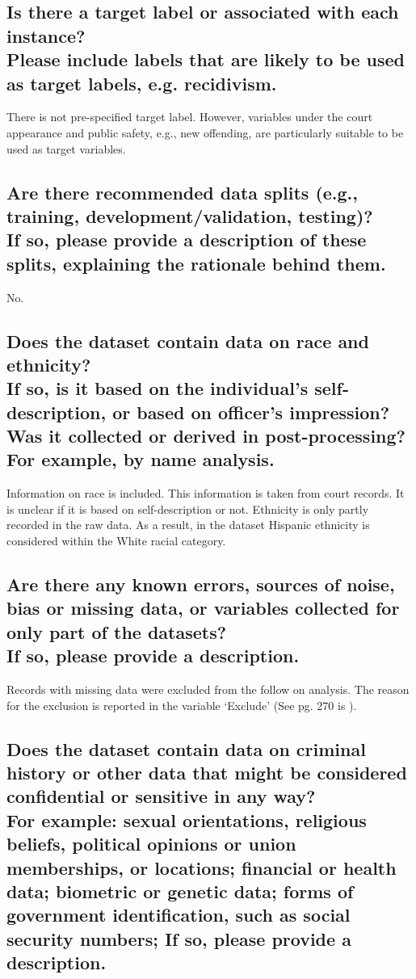 \documentclass[letterpaper, 10 pt, conference]{ieeeconf}  %
\newcommand{\subtitle}[1]{{\\ \small \normalfont \color{purple} #1}}
\begin{document}
\subsection{Is there a target label or associated with each instance? \subtitle{Please include labels that are likely to be used as target labels, e.g. recidivism.}}

There is not pre-specified target label. However, variables under the court appearance and public safety, e.g., new offending, are particularly suitable to be used as target variables. 

\subsection{Are there recommended data splits (e.g., training, development/validation, testing)? \subtitle{If so, please provide a description of these splits, explaining the rationale behind them.}}

No.

\subsection{Does the dataset contain data on race and ethnicity? \subtitle{If so, is it based on the individual's self-description, or based on officer's impression? Was it collected or derived in post-processing? For example, by name analysis.}}

Information on race is included. This information is taken from court records. It is unclear if it is based on self-description or not. Ethnicity is only partly recorded in the raw data. As a result, in the dataset Hispanic ethnicity is considered within the White racial category.

\subsection{Are there any known errors, sources of noise, bias or missing data, or variables collected for only part of the datasets? \subtitle{If so, please provide a description.}}

Records with missing data were excluded from the follow on analysis. The reason for the exclusion is reported in the variable `Exclude' (See pg. 270 is \cite{codebook}).

\subsection{Does the dataset contain data on criminal history or other data that might be considered confidential or sensitive in any way? \subtitle{For example: sexual orientations, religious beliefs, political opinions or union memberships, or locations; financial or health data; biometric or genetic data; forms of government identification, such as social security numbers; If so, please provide a description.}}
\end{document}
